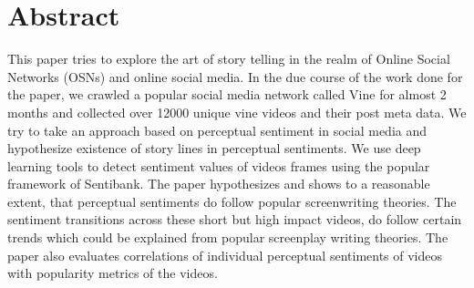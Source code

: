 \section{Abstract}
This paper tries to explore the art of story telling in the realm of Online Social Networks (OSNs) and online social media. In the due course of the work done for the paper, we crawled a popular social media network called Vine for almost 2 months and collected over 12000 unique vine videos and their post meta data. We try to take an approach based on perceptual sentiment in social media and hypothesize existence of story lines in perceptual sentiments. We use deep learning tools to detect sentiment values of videos frames using the popular framework of Sentibank. The paper hypothesizes and shows to a reasonable extent, that perceptual sentiments do follow popular screenwriting theories. The sentiment transitions across these short but high impact videos, do follow certain trends which could be explained from popular screenplay writing theories. The paper also evaluates correlations of individual perceptual sentiments of videos with popularity metrics of the videos.  